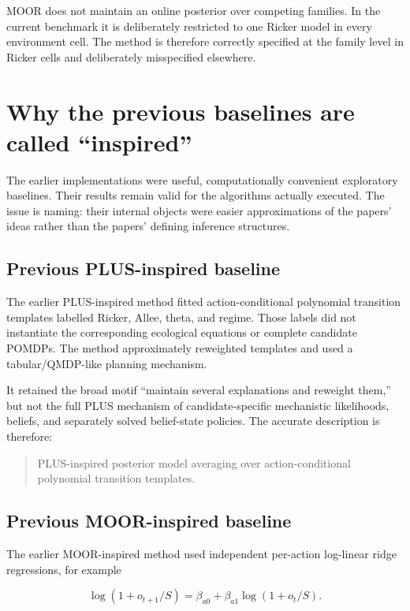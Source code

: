 \documentclass[11pt]{article}
\begin{document}
MOOR does not maintain an online posterior over competing families. In the current benchmark it is
deliberately restricted to one Ricker model in every environment cell. The method is therefore
correctly specified at the family level in Ricker cells and deliberately misspecified elsewhere.

\section{Why the previous baselines are called ``inspired''}

The earlier implementations were useful, computationally convenient exploratory baselines. Their
results remain valid for the algorithms actually executed. The issue is naming: their internal
objects were easier approximations of the papers' ideas rather than the papers' defining inference
structures.

\subsection{Previous PLUS-inspired baseline}

The earlier PLUS-inspired method fitted action-conditional polynomial transition templates labelled
Ricker, Allee, theta, and regime. Those labels did not instantiate the corresponding ecological
equations or complete candidate POMDPs. The method approximately reweighted templates and used a
tabular/QMDP-like planning mechanism.

It retained the broad motif ``maintain several explanations and reweight them,'' but not the full
PLUS mechanism of candidate-specific mechanistic likelihoods, beliefs, and separately solved
belief-state policies. The accurate description is therefore:

\begin{quote}
PLUS-inspired posterior model averaging over action-conditional polynomial transition templates.
\end{quote}

\subsection{Previous MOOR-inspired baseline}

The earlier MOOR-inspired method used independent per-action log-linear ridge regressions, for
example

\begin{equation}
\log(1+o_{t+1}/S)=\beta_{a0}+\beta_{a1}\log(1+o_t/S).
\end{equation}
\end{document}
